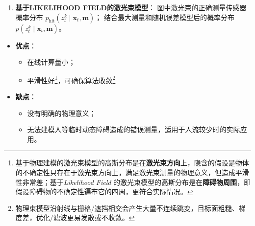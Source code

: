 \documentclass[../main.tex]{subfiles}
\begin{document}
\begin{enumerate}
\begin{itemize}
\begin{enumerate}
      \item \textbf{基于\;LIKELIHOOD FIELD\;的激光束模型}：
      图中激光束的正确测量传感器概率分布 $p_{\mathrm{hit}}\!\left(z_t^{k}\mid \mathbf{x}_t,\mathbf{m}\right)$；
      结合最大测量和随机误差模型后的概率分布
      $p\!\left(z_t^{k}\mid \mathbf{x}_t,\mathbf{m}\right)$。

    \end{enumerate}
\end{itemize}
    \begin{itemize}
        \item \textbf{优点}：
        \begin{itemize}
            \item 在线计算量小；
            \item 平滑性好\footnote{基于物理建模的激光束模型的高斯分布是在\textbf{激光束方向}上，隐含的假设是物体的不确定性只存在于激光束方向上，满足激光束测量的物理意义，但造成平滑性非常差；基于\emph{Likelihood Field} 的激光束模型的高斯分布是在\textbf{障碍物周围}，即假设障碍物的不确定性遍布它的四周，更符合实际情况。}，可确保算法收敛\footnote{物理束模型沿射线与栅格/遮挡相交会产生大量不连续跳变，目标面粗糙、梯度差，优化/滤波更易发散或不收敛。}
        \end{itemize}
        \item \textbf{缺点}：
        \begin{itemize}
            \item 没有明确的物理意义；
            \item 无法建模人等临时动态障碍造成的错误测量，适用于人流较少时的实际应用。
        \end{itemize}
          
      
    
     
    



 \end{itemize}




            
\end{enumerate}
\end{document}
